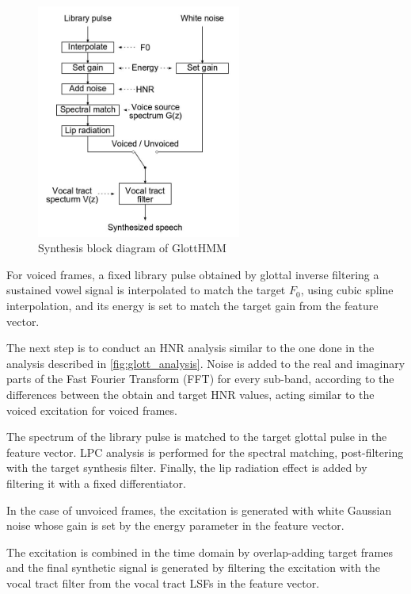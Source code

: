 \begin{figure}[!htb]
\begin{centering}
\includegraphics[width=0.6\textwidth]{images/glott_synthesis.jpg}
\caption{Synthesis block diagram of GlottHMM \cite{manuMSc}}
\label{fig:glott_synthesis}
\end{centering}
\end{figure}

For voiced frames, a fixed library pulse obtained by glottal inverse filtering a sustained vowel signal is interpolated to match the target $F_{0}$, using cubic spline interpolation, and its energy is set to match the target gain from the feature vector.

The next step is to conduct an HNR analysis similar to the one done in the analysis described in \ref{fig:glott_analysis}.
%
Noise is added to the real and imaginary parts of the Fast Fourier Transform (FFT) for every sub-band, according to the differences between the obtain and target HNR values, acting similar to the voiced excitation for voiced frames.

The spectrum of the library pulse is matched to the target glottal pulse in the feature vector.
%
LPC analysis is performed for the spectral matching, post-filtering with the target synthesis filter. Finally, the lip radiation effect is added by filtering it with a fixed differentiator.

In the case of unvoiced frames, the excitation is generated with white Gaussian noise whose gain is set by the energy parameter in the feature vector.

The excitation is combined in the time domain by overlap-adding target frames and the final synthetic signal is generated by filtering the excitation with the vocal tract filter from the vocal tract LSFs in the feature vector.

